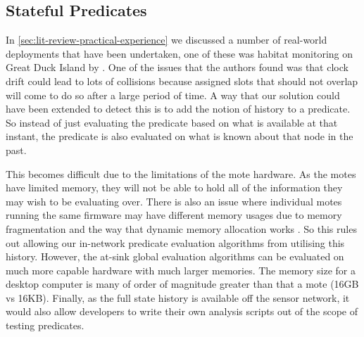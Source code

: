 %

\subsection{Stateful Predicates}

In \autoref{sec:lit-review-practical-experience} we discussed a number of real-world deployments that have been undertaken, one of these was habitat monitoring on Great Duck Island by \citeauthor{SzewczykPMC04}. One of the issues that the authors found was that clock drift could lead to lots of collisions because assigned slots that should not overlap will come to do so after a large period of time. A way that our solution could have been extended to detect this is to add the notion of history to a predicate. So instead of just evaluating the predicate based on what is available at that instant, the predicate is also evaluated on what is known about that node in the past.

This becomes difficult due to the limitations of the mote hardware. As the motes have limited memory, they will not be able to hold all of the information they may wish to be evaluating over. There is also an issue where individual motes running the same firmware may have different memory usages due to memory fragmentation and the way that dynamic memory allocation works \cite{Dai:2004:EEL:1031495.1031516}. So this rules out allowing our in-network predicate evaluation algorithms from utilising this history. However, the at-sink global evaluation algorithms can be evaluated on much more capable hardware with much larger memories. The memory size for a desktop computer is many of order of magnitude greater than that a mote (16GB vs 16KB). Finally, as the full state history is available off the sensor network, it would also allow developers to write their own analysis scripts out of the scope of testing predicates.


